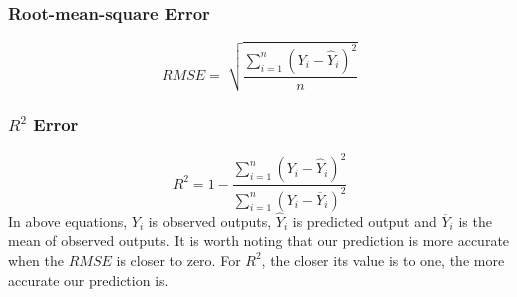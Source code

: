 \documentclass[conference]{IEEEtran}
\newcommand*{\SET}[1]{\ensuremath{\boldsymbol{#1}}}
\begin{document}
\subsubsection*{Root-mean-square Error}
\begin{equation}
  RMSE=\sqrt[]{\frac{\sum_{i=1}^{n}(Y_i-\hat{Y}_i)^2}{n}}
\end{equation}
\subsubsection*{$R^2$ Error}
\begin{equation}
 R^2=1-\frac{\sum_{i=1}^{n}(Y_i-\hat{Y}_i)^2}{\sum_{i=1}^{n}(Y_i-\overline{Y}_i)^2}
\end{equation}
In above equations, $Y_i$ is observed outputs, $\hat{Y}_i$ is predicted output and $\overline{Y}_i$ is the mean of observed outputs. It is worth noting that our prediction is more accurate when the $RMSE$ is closer to zero. For $R^2$, the closer its value is to one, the more accurate our prediction is.


\end{document}
